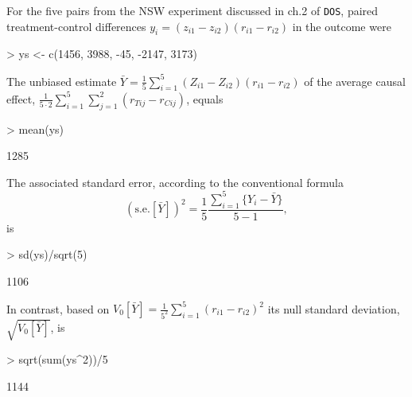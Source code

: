 For the five pairs from the NSW experiment discussed in ch.2 of
\texttt{DOS},  paired treatment-control differences $y_{i} = (z_{i1} -
z_{i2})(r_{i1} - r_{i2})$ in the outcome were

\begin{Schunk}
\begin{Sinput}
> ys <- c(1456, 3988, -45, -2147, 3173) 
\end{Sinput}
\end{Schunk}
 
The unbiased estimate $\bar Y = \frac{1}{5}\sum_{i=1}^{5}  (Z_{i1} -
Z_{i2})(r_{i1} - r_{i2})$ of the average causal effect, $\frac{1}{5\cdot
  2} \sum_{i=1}^{5}\sum_{j=1}^{2} (r_{Tij} - r_{Cij})$, equals

\begin{Schunk}
\begin{Sinput}
> mean(ys)
\end{Sinput}
\begin{Soutput}
[1] 1285
\end{Soutput}
\end{Schunk}

The associated standard error, according to the conventional formula 
$$(\mathrm{s.e.}[\bar Y])^{2} = \frac{1}{5}  \frac{\sum_{i=1}^{5} \{Y_{i}  - \bar Y\} }{5-1},$$
 is  
\begin{Schunk}
\begin{Sinput}
> sd(ys)/sqrt(5)
\end{Sinput}
\begin{Soutput}
[1] 1106
\end{Soutput}
\end{Schunk}


In contrast, based on 
$V_{0}[\bar Y] = \frac{1}{5^{2}} \sum_{i=1}^{5} (r_{i1} - r_{i2})^{2}$
its null standard deviation, $\sqrt{V_{0}[\bar Y]}$, is 
\begin{Schunk}
\begin{Sinput}
> sqrt(sum(ys^2))/5
\end{Sinput}
\begin{Soutput}
[1] 1144
\end{Soutput}
\end{Schunk}

